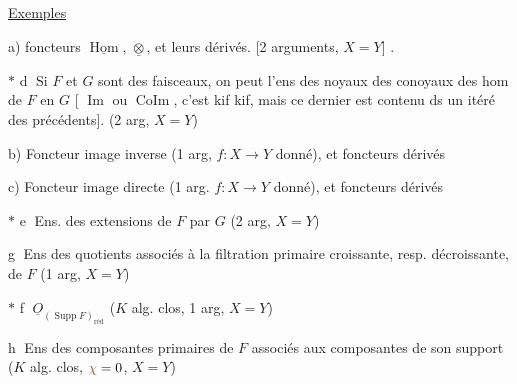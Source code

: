 \uline{Exemples}

a) foncteurs $\underline{\operatorname{Hom}}$, $\underline{\otimes}$, et leurs dérivés. [2 arguments, $X=Y$] .

$*$ \textcircled{d} Si $F$ et $G$ sont des faisceaux, on peut  l'ens  des noyaux  des conoyaux des hom de $F$ en $G$ [ $\operatorname{Im}$ ou $\operatorname{CoIm}$, c'est kif kif, mais ce dernier est contenu ds un itéré des précédents]. (2 arg, $X=Y$)


b) Foncteur image inverse (1 arg, $f:X\to Y$ donné), et foncteurs dérivés

c) Foncteur image directe (1 arg. $f:X\to Y$  donné), et foncteurs dérivés

$*$ \textcircled{e} Ens. des extensions de $F$ par $G$ (2 arg, $X=Y$)

\textcircled{g} Ens des quotients associés à la filtration primaire croissante, resp. décroissante, de $F$ (1 arg, $X=Y$)

$*$ \textcircled{f}   $\underline O_{(\operatorname{Supp}F)_{\text{réd}}}$ ($K$ alg. clos, 1 arg, $X=Y$)


\textcircled{h} Ens des   composantes primaires de $F$ associés aux composantes de son support ($K$ alg. clos, $\unsure{\chi}=0$, $X=Y$)

